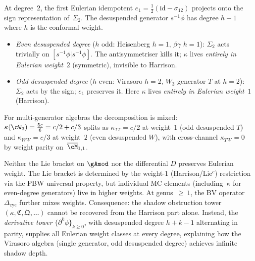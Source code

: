 \begin{remark}
\label{rem:kappa-eulerian-weight}
At degree~$2$, the first Eulerian idempotent $e_1 = \tfrac{1}{2}(\mathrm{id} - \sigma_{12})$
projects onto the sign representation of~$\Sigma_2$. The desuspended
generator $s^{-1}\phi$ has degree $h - 1$ where $h$ is the conformal weight.
\begin{itemize}
\item \emph{Even desuspended degree} ($h$ odd: Heisenberg $h{=}1$, $\beta\gamma$ $h{=}1$):
 $\Sigma_2$ acts trivially on $[s^{-1}\phi | s^{-1}\phi]$.
 The antisymmetriser kills it; $\kappa$ lives
 \emph{entirely in Eulerian weight~$2$} (symmetric), invisible to Harrison.
\item \emph{Odd desuspended degree} ($h$ even: Virasoro $h{=}2$, $W_3$ generator $T$ at $h{=}2$):
 $\Sigma_2$ acts by the sign; $e_1$ preserves it.
 Here $\kappa$ lives \emph{entirely in Eulerian weight~$1$} (Harrison).
\end{itemize}
For multi-generator algebras the decomposition is mixed:
$\kappa(\cW_3) = \tfrac{5c}{6} = c/2 + c/3$ splits as
$\kappa_{TT} = c/2$ at weight~$1$ (odd desuspended $T$) and
$\kappa_{WW} = c/3$ at weight~$2$ (even desuspended $W$),
with cross-channel $\kappa_{TW} = 0$ by weight parity on~$\overline{\cM}_{1,1}$.
\end{remark}

\begin{remark}
\label{rem:mc-not-eulerian-graded}
Neither the Lie bracket on $\gAmod$ nor the differential $D$
preserves Eulerian weight. The Lie bracket is determined by
the weight-$1$ (Harrison/Lie$^c$) restriction via the PBW
universal property, but individual MC elements (including~$\kappa$
for even-degree generators) live in higher weights.
At genus~${\geq}\,1$, the BV operator $\Delta_{\mathrm{cyc}}$ further
mixes weights. Consequence: the shadow obstruction tower
$(\kappa, \mathfrak{C}, \mathfrak{Q}, \ldots)$ cannot be recovered
from the Harrison part alone. Instead, the \emph{derivative tower}
$\{\partial^k\phi\}_{k \geq 0}$, with desuspended degree $h{+}k{-}1$
alternating in parity, supplies all Eulerian weight classes at
every degree, explaining how the Virasoro algebra (single generator,
odd desuspended degree) achieves infinite shadow depth.
\end{remark}

